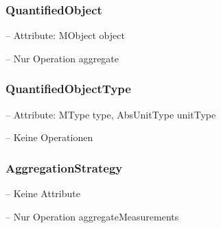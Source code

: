 \subsubsection{QuantifiedObject}


-- Attribute: MObject object

-- Nur Operation aggregate


\subsubsection{QuantifiedObjectType}


-- Attribute: MType type, AbsUnitType unitType

-- Keine Operationen


\subsubsection{AggregationStrategy}


-- Keine Attribute

-- Nur Operation aggregateMeasurements



